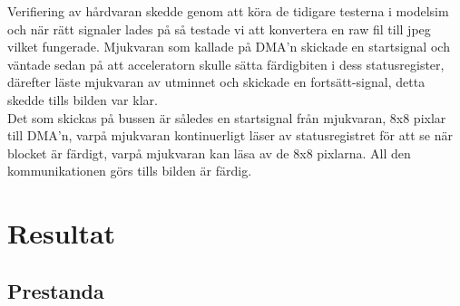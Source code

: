 \documentclass[a4paper]{article}
\begin{document}
Verifiering av hårdvaran skedde genom att köra de tidigare testerna i
modelsim och när rätt signaler lades på så testade vi att konvertera en
raw fil till jpeg vilket fungerade. Mjukvaran som kallade på DMA\rq{}n
skickade en startsignal och väntade sedan på att acceleratorn skulle
sätta färdigbiten i dess statusregister, därefter läste mjukvaran av
utminnet och skickade en fortsätt-signal, detta skedde tills bilden var
klar.\\

Det som skickas på bussen är således en startsignal från mjukvaran, 8x8
pixlar till DMA\rq{}n, varpå mjukvaran kontinuerligt läser av
statusregistret för att se när blocket är färdigt, varpå mjukvaran kan
läsa av de 8x8 pixlarna. All den kommunikationen görs tills bilden är
färdig.\\

\section{Resultat}

\subsection{Prestanda}
\end{document}
